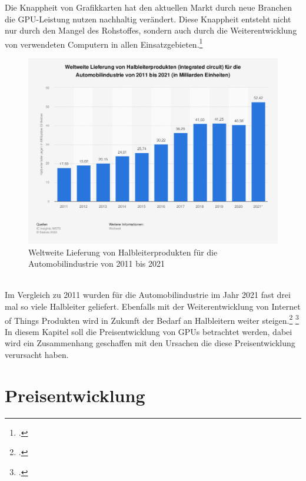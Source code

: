 \documentclass[12pt,toc=bib,toc=listof]{scrreprt}
\begin{document}
Die Knappheit von Grafikkarten hat den
aktuellen Markt durch neue Branchen die GPU-Leistung nutzen nachhaltig verändert.
Diese Knappheit entsteht nicht nur durch den Mangel des Rohstoffes, sondern auch durch die 
Weiterentwicklung von verwendeten Computern in allen Einsatzgebieten.\footcite [Vgl.] []{Voas.2021}
\\
\begin{figure}[h]
  \centering
  \includegraphics[scale=0.35]{Abbildungen/Martin_Kords_1.png} %
  \caption[]{Weltweite Lieferung von Halbleiterprodukten für die Automobilindustrie von 2011 bis 2021}
\end{figure}
\\
Im Vergleich zu 2011 wurden für die Automobilindustrie im Jahr 2021 fast drei mal so viele
Halbleiter geliefert. Ebenfalls mit der Weiterentwicklung von Internet of Things Produkten wird in
Zukunft der Bedarf an Halbleitern weiter steigen.\footcite [Vgl.] []{Bill_McClean} \footcite [Vgl.] []{Voas.2021} 
\\In diesem Kapitel soll die Preisentwicklung von GPUs betrachtet werden, dabei wird 
ein Zusammenhang geschaffen mit den Ursachen die diese Preisentwicklung 
verursacht haben.
\\ %

\section{Preisentwicklung}
\label{sec:Preisentwicklung}
\end{document}
